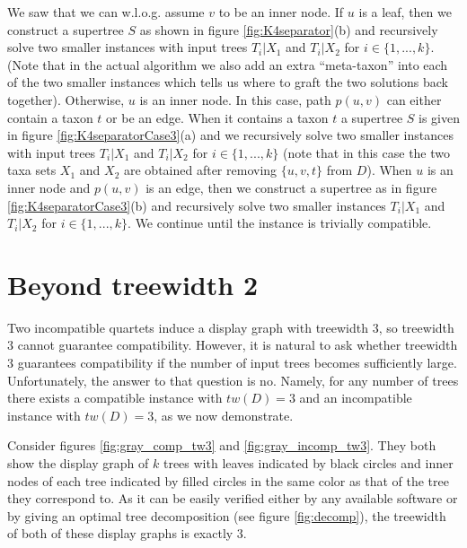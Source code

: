 We saw that we can w.l.o.g. assume $v$ to be an inner node. If $u$ is a leaf, then we construct a supertree $S$ as shown in figure \ref{fig:K4separator}(b) and recursively solve two smaller instances with input trees $T_i|X_1$ and $T_i|X_2$ for $i \in \{1,...,k\}$. (Note that in the actual algorithm we also add an extra ``meta-taxon'' into each of the two smaller instances which tells us where to graft the two solutions back together). Otherwise, $u$ is an inner node. In this case, path $p(u,v)$ can either contain a taxon $t$ or be an edge. When it contains a taxon $t$ a supertree $S$ is given in figure \ref{fig:K4separatorCase3}(a) and we recursively solve two smaller instances with input trees $T_i|X_1$ and $T_i|X_2$ for $i \in \{1,...,k\}$ (note that in this case the two taxa sets $X_1$ and $X_2$ are obtained after removing $\{u,v,t\}$ from $D$). When $u$ is an inner node and $p(u,v)$ is an edge, then we construct a supertree as in figure \ref{fig:K4separatorCase3}(b) and recursively solve two smaller instances $T_i|X_1$ and $T_i|X_2$ for $i \in \{1,...,k\}$. We continue until the instance is trivially compatible. 





\section{Beyond treewidth 2}

Two incompatible quartets induce a display graph with treewidth 3, so treewidth 3 cannot guarantee compatibility. However, it is natural to ask whether treewidth 3 guarantees compatibility if the number of input trees becomes sufficiently large. Unfortunately, the answer to that question is no. Namely, for any number of trees there exists a compatible instance with $tw(D)=3$ and an incompatible instance with $tw(D)=3$, as we now demonstrate. 

Consider figures \ref{fig:gray_comp_tw3} and \ref{fig:gray_incomp_tw3}. They both show the display graph of $k$ trees with leaves indicated by black circles and inner nodes of each tree indicated by filled circles in the same color as that of the tree they correspond to. 
As it can be easily verified either by any available software or by giving an optimal tree decomposition (see figure \ref{fig:decomp}), the treewidth of both of these display graphs is exactly 3. 

